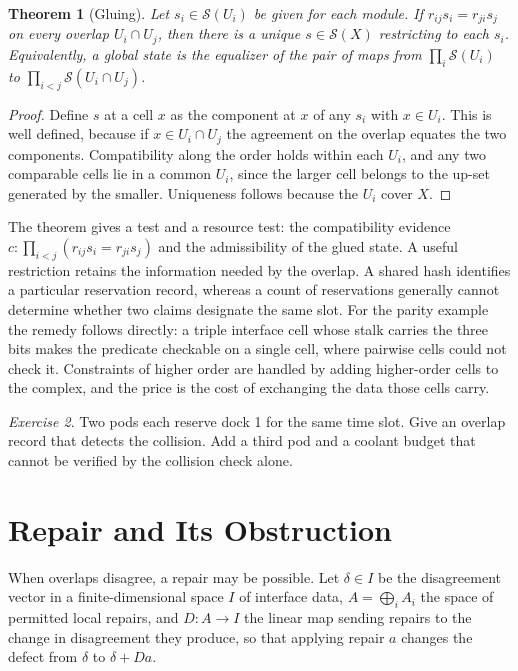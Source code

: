 \documentclass[11pt,openany]{book}
\theoremstyle{plain}
\newtheorem{theorem}{Theorem}[chapter]
\theoremstyle{definition}
\theoremstyle{remark}
\newtheorem{exercise}[theorem]{Exercise}
\begin{document}
\begin{theorem}[Gluing]
\label{thm:glue}
Let $s_i\in\mathcal S(U_i)$ be given for each module. If $r_{ij}s_i=r_{ji}s_j$ on every overlap $U_i\cap U_j$, then there is a unique $s\in\mathcal S(X)$ restricting to each $s_i$. Equivalently, a global state is the equalizer of the pair of maps from $\prod_i\mathcal S(U_i)$ to $\prod_{i<j}\mathcal S(U_i\cap U_j)$.
\end{theorem}
\begin{proof}
Define $s$ at a cell $x$ as the component at $x$ of any $s_i$ with $x\in U_i$. This is well defined, because if $x\in U_i\cap U_j$ the agreement on the overlap equates the two components. Compatibility along the order holds within each $U_i$, and any two comparable cells lie in a common $U_i$, since the larger cell belongs to the up-set generated by the smaller. Uniqueness follows because the $U_i$ cover $X$.
\end{proof}

The theorem gives a test and a resource test: the compatibility evidence $c:\prod_{i<j}(r_{ij}s_i=r_{ji}s_j)$ and the admissibility of the glued state. A useful restriction retains the information needed by the overlap. A shared hash identifies a particular reservation record, whereas a count of reservations generally cannot determine whether two claims designate the same slot. For the parity example the remedy follows directly: a triple interface cell whose stalk carries the three bits makes the predicate checkable on a single cell, where pairwise cells could not check it. Constraints of higher order are handled by adding higher-order cells to the complex, and the price is the cost of exchanging the data those cells carry.

\begin{exercise}
Two pods each reserve dock 1 for the same time slot. Give an overlap record that detects the collision. Add a third pod and a coolant budget that cannot be verified by the collision check alone.
\end{exercise}

\section{Repair and Its Obstruction}

When overlaps disagree, a repair may be possible. Let $\delta\in I$ be the disagreement vector in a finite-dimensional space $I$ of interface data, $A=\bigoplus_iA_i$ the space of permitted local repairs, and $D:A\to I$ the linear map sending repairs to the change in disagreement they produce, so that applying repair $a$ changes the defect from $\delta$ to $\delta+Da$.
\end{document}

